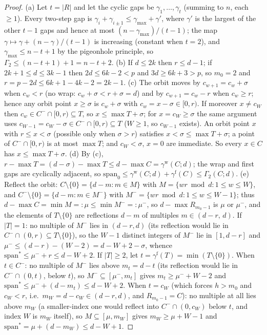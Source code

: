 \documentclass[11pt,a4paper]{article}
\numberwithin{equation}{section}
\theoremstyle{plain}
\theoremstyle{definition}
\theoremstyle{remark}
\begin{document}
\begin{proof}
(a) Let $t=|R|$ and let the cyclic gaps be $\gamma_1,\dots,\gamma_t$
(summing to $n$, each $\ge1$). Every two-step gap is
$\gamma_i+\gamma_{i\pm1}\le\gamma_{\max}+\gamma'$, where $\gamma'$ is
the largest of the other $t-1$ gaps and hence at most
$(n-\gamma_{\max})/(t-1)$; the map $\gamma\mapsto\gamma+(n-\gamma)/(t-1)$
is increasing (constant when $t=2$), and
$\gamma_{\max}\le n-t+1$ by the pigeonhole principle, so
$\Gamma_2\le(n-t+1)+1=n-t+2$.
(b) If $d\le2k$ then $r\le d-1$; if $2k+1\le d\le3k-1$ then
$2d\le6k-2<p$ and $3d\ge6k+3>p$, so $m_0=2$ and
$r=p-2d\le6k+1-4k-2=2k-1$.
(c) The orbit moves by $c_{w+1}=c_w+\sigma$ when $c_w<r$ (no wrap:
$c_w+\sigma<r+\sigma=d$) and by $c_{w+1}=c_w-r$ when $c_w\ge r$; hence
any orbit point $x\ge\sigma$ is $c_w+\sigma$ with $c_w=x-\sigma\in[0,r)$.
If moreover $x\ne c_W$ then $c_w\in C^-\cap[0,r)\subseteq T$, so
$x\le\max T+\sigma$; for $x=c_W\ge\sigma$ the same argument uses
$c_{W-1}=c_W-\sigma\in C^-\cap[0,r)\subseteq T$ ($W\ge1$, so $c_{W-1}$
exists). An orbit point $x$ with $r\le x<\sigma$ (possible only when
$\sigma>r$) satisfies $x<\sigma\le\max T+\sigma$; a point of
$C^-\cap[0,r)$ is at most $\max T$; and $c_W<\sigma$, $x=0$ are
immediate. So every $x\in C$ has $x\le\max T+\sigma$.
(d) By (c), $r-\max T=(d-\sigma)-\max T\le d-\max
C=\gamma^{\mathrm w}(C;d)$; the wrap and first gaps are cyclically
adjacent, so $\mathrm{span}_0\le\gamma^{\mathrm w}(C;d)+\gamma^{\mathrm
f}(C)\le\Gamma_2(C;d)$.
(e) Reflect the orbit: $C\setminus\{0\}=\{d-m:m\in M\}$ with
$M=\{wr\bmod d:1\le w\le W\}$, and $C^-\setminus\{0\}=\{d-m:m\in M^-\}$
with $M^-=\{wr\bmod d:1\le w\le W-1\}$; thus $d-\max C=\min M=:\mu\le
\min M^-=:\mu^-$, so $d-\max R_{m_0-1}$ is $\mu$ or $\mu^-$, and the
elements of $T\setminus\{0\}$ are reflections $d-m$ of multiples
$m\in(d-r,\,d)$. If $|T|=1$: no multiple of $M^-$ lies in $(d-r,d)$
(its reflection would lie in $C^-\cap(0,r)\subseteq T\setminus\{0\}$),
so the $W-1$ distinct integers of $M^-$ lie in $[1,d-r]$ and
$\mu^-\le(d-r)-(W-2)=d-W+2-\sigma$, whence
$\mathrm{span}^\ast\le\mu^-+r\le d-W+2$. If $|T|\ge2$, let
$t=\gamma^{\mathrm f}(T)=\min(T\setminus\{0\})$. When $t\in C^-$: no
multiple of $M^-$ lies above $m_t=d-t$ (its reflection would lie in
$C^-\cap(0,t)$, below $t$), so $M^-\subseteq[\mu^-,m_t]$ gives
$m_t\ge\mu^-+W-2$ and
$\mathrm{span}^\ast\le\mu^-+(d-m_t)\le d-W+2$. When $t=c_W$ (which
forces $h>m_0$ and $c_W<r$, i.e.\ $m_W=d-c_W\in(d-r,d)$, and
$R_{m_0-1}=C$): no multiple at all lies above $m_W$ (a smaller-index
one would reflect into $C^-\cap(0,c_W)$ below $t$, and index $W$ is
$m_W$ itself), so $M\subseteq[\mu,m_W]$ gives $m_W\ge\mu+W-1$ and
$\mathrm{span}^\ast=\mu+(d-m_W)\le d-W+1$.
\end{proof}
\end{document}
